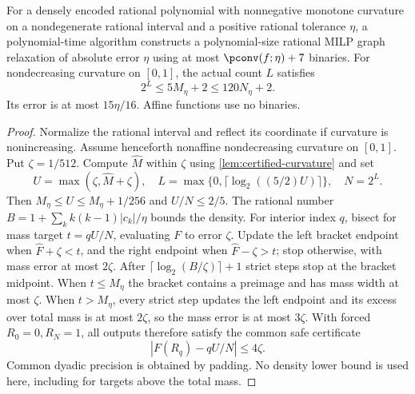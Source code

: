 \begin{theorem}\label{thm:compiled-curvature}
For a densely encoded rational polynomial with nonnegative monotone
curvature on a nondegenerate rational interval and a positive rational
tolerance $\eta$, a polynomial-time algorithm constructs
a polynomial-size rational MILP graph relaxation of absolute error
$\eta$ using at most $\pconv(f;\eta)+7$ binaries.
For nondecreasing curvature on $[0,1]$, the actual count $L$ satisfies
\begin{equation}\label{eq:compiled-mass-count}
 2^L\le5M_\eta+2\le120N_\eta+2.
\end{equation}
Its error is at most $15\eta/16$. Affine functions use no binaries.
\end{theorem}
\begin{proof}
Normalize the rational interval and reflect its coordinate if curvature
is nonincreasing. Assume henceforth nonaffine nondecreasing curvature on
$[0,1]$. Put $\zeta=1/512$. Compute $\widehat M$ within $\zeta$
using \cref{lem:certified-curvature} and set
\[
 U=\max(\zeta,\widehat M+\zeta),\quad
 L=\max\{0,\lceil\log_2((5/2)U)\rceil\},\quad N=2^L.
\]
Then $M_\eta\le U\le M_\eta+1/256$ and $U/N\le2/5$.
The rational number $B=1+\sum_k k(k-1)|c_k|/\eta$ bounds the
density. For interior index $q$, bisect for mass target $t=qU/N$,
evaluating $F$ to error $\zeta$. Update the left bracket endpoint when
$\widehat F+\zeta<t$, and the right endpoint when
$\widehat F-\zeta>t$; stop
otherwise, with mass error at most $2\zeta$. After
$\lceil\log_2(B/\zeta)\rceil+1$ strict steps stop at the bracket
midpoint. When $t\le M_\eta$ the bracket contains a preimage and
has mass width at most $\zeta$. When $t>M_\eta$, every strict step
updates the left endpoint and its excess over total mass is at most $2\zeta$, so
the mass error is at most $3\zeta$. With forced $R_0=0,R_N=1$,
all outputs therefore satisfy the common safe certificate
\begin{equation}\label{eq:mass-knot-certificate}
 |F(R_q)-qU/N|\le4\zeta.
\end{equation}
Common dyadic precision is obtained by padding. No density lower bound
is used here, including for targets above the total mass.


\end{proof}
